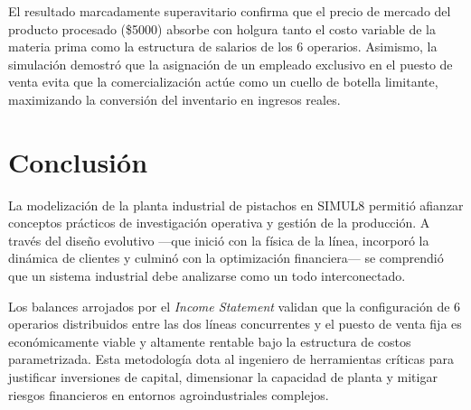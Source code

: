 \documentclass{llncs}
\begin{document}
El resultado marcadamente superavitario confirma que el precio de mercado del producto procesado (\$5000) absorbe con holgura tanto el costo variable de la materia prima como la estructura de salarios de los 6 operarios. Asimismo, la simulación demostró que la asignación de un empleado exclusivo en el puesto de venta evita que la comercialización actúe como un cuello de botella limitante, maximizando la conversión del inventario en ingresos reales.

\section{Conclusión}
La modelización de la planta industrial de pistachos en SIMUL8 permitió afianzar conceptos prácticos de investigación operativa y gestión de la producción. A través del diseño evolutivo —que inició con la física de la línea, incorporó la dinámica de clientes y culminó con la optimización financiera— se comprendió que un sistema industrial debe analizarse como un todo interconectado. 

Los balances arrojados por el \textit{Income Statement} validan que la configuración de 6 operarios distribuidos entre las dos líneas concurrentes y el puesto de venta fija es económicamente viable y altamente rentable bajo la estructura de costos parametrizada. Esta metodología dota al ingeniero de herramientas críticas para justificar inversiones de capital, dimensionar la capacidad de planta y mitigar riesgos financieros en entornos agroindustriales complejos.
\end{document}
